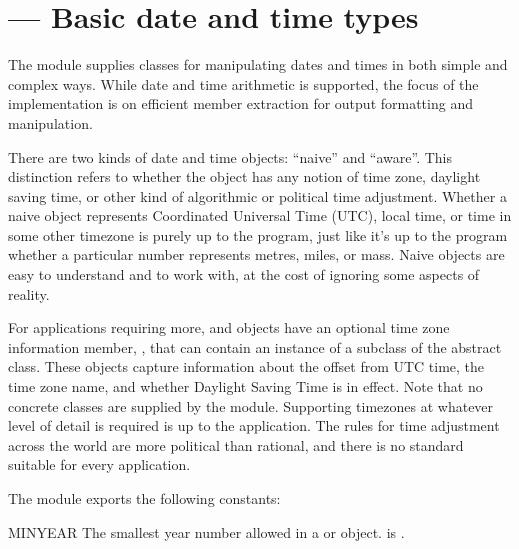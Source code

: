 
\section{ ---
         Basic date and time types}




The  module supplies classes for manipulating dates
and times in both simple and complex ways.  While date and time
arithmetic is supported, the focus of the implementation is on
efficient member extraction for output formatting and manipulation.

There are two kinds of date and time objects: ``naive'' and ``aware''.
This distinction refers to whether the object has any notion of time
zone, daylight saving time, or other kind of algorithmic or political
time adjustment.  Whether a naive  object represents
Coordinated Universal Time (UTC), local time, or time in some other
timezone is purely up to the program, just like it's up to the program
whether a particular number represents metres, miles, or mass.  Naive
 objects are easy to understand and to work with, at
the cost of ignoring some aspects of reality.

For applications requiring more,  and 
objects have an optional time zone information member,
, that can contain an instance of a subclass of
the abstract  class.  These  objects
capture information about the offset from UTC time, the time zone
name, and whether Daylight Saving Time is in effect.  Note that no
concrete  classes are supplied by the 
module.  Supporting timezones at whatever level of detail is required
is up to the application.  The rules for time adjustment across the
world are more political than rational, and there is no standard
suitable for every application.

The  module exports the following constants:

\begin{datadesc}{MINYEAR}
  The smallest year number allowed in a  or
   object.  
  is .
\end{datadesc}

